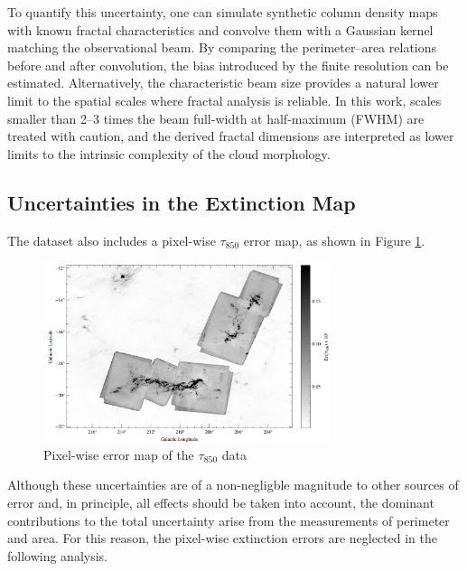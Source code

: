To quantify this uncertainty, one can simulate synthetic column density maps with known fractal characteristics and convolve them with a Gaussian kernel matching the observational beam. By comparing the perimeter–area relations before and after convolution, the bias introduced by the finite resolution can be estimated. Alternatively, the characteristic beam size provides a natural lower limit to the spatial scales where fractal analysis is reliable. In this work, scales smaller than 2–3 times the beam full-width at half-maximum (FWHM) are treated with caution, and the derived fractal dimensions are interpreted as lower limits to the intrinsic complexity of the cloud morphology.

\subsection{Uncertainties in the Extinction Map}

The dataset also includes a pixel-wise $\tau_{850}$ error map, as shown in Figure \ref{fig:error_map}. 

\begin{figure}[t]
    \centering
    \includegraphics[width=0.75\textwidth]{figures/error_map.png}
    \caption{Pixel-wise error map of the $\tau_{850}$ data \cite{lombardi2014herschel}}
    \label{fig:error_map}
\end{figure}

Although these uncertainties are of a non-negligble magnitude to other sources of error and, in principle, all effects should be taken into account, the dominant contributions to the total uncertainty arise from the measurements of perimeter and area. 
For this reason, the pixel-wise extinction errors are neglected in the following analysis.
